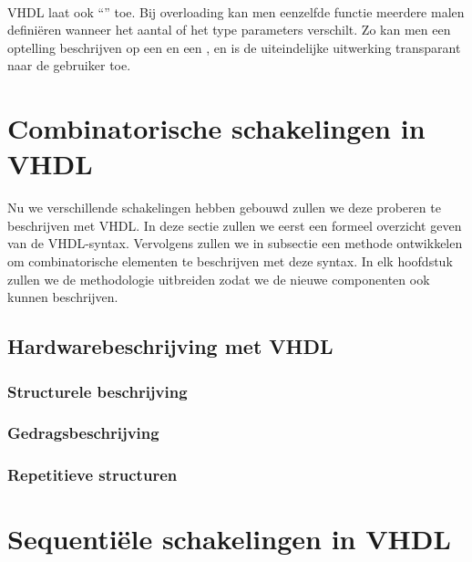 \paragraph{}
VHDL laat ook ``'' toe. Bij overloading kan men eenzelfde functie meerdere malen defini\"eren wanneer het aantal of het type parameters verschilt. Zo kan men een optelling beschrijven op een  en een , en is de uiteindelijke uitwerking transparant naar de gebruiker toe.

\section{Combinatorische schakelingen in VHDL}
Nu we verschillende schakelingen hebben gebouwd zullen we deze proberen te beschrijven met VHDL. In deze sectie zullen we eerst een formeel overzicht geven van de VHDL-syntax. Vervolgens zullen we in subsectie  een methode ontwikkelen om combinatorische elementen te beschrijven met deze syntax. In elk hoofdstuk zullen we de methodologie uitbreiden zodat we de nieuwe componenten ook kunnen beschrijven.

\subsection{Hardwarebeschrijving met VHDL}

\subsubsection{Structurele beschrijving}

\subsubsection{Gedragsbeschrijving}

\subsubsection{Repetitieve structuren}

\section{Sequenti\"ele schakelingen in VHDL}

